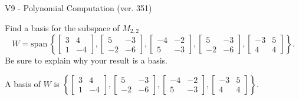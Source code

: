 \begin{exercise}
  \begin{exerciseTitle}V9 - Polynomial Computation (ver. 351)\end{exerciseTitle}
  \begin{exerciseStatement}
    Find a basis for the subspace of \(M_{2,2}\) 
\[W=\mathrm{span}\ \left\{\left[\begin{array}{cc}
3 & 4 \\
1 & -4
\end{array}\right] , \left[\begin{array}{cc}
5 & -3 \\
-2 & -6
\end{array}\right] , \left[\begin{array}{cc}
-4 & -2 \\
5 & -3
\end{array}\right] , \left[\begin{array}{cc}
5 & -3 \\
-2 & -6
\end{array}\right] , \left[\begin{array}{cc}
-3 & 5 \\
4 & 4
\end{array}\right]\right\}.\]
 Be sure to explain why your result is a basis.


  \end{exerciseStatement}
  \begin{exerciseAnswer}
   A basis of \(W\) is  \(\left\{\left[\begin{array}{cc}
3 & 4 \\
1 & -4
\end{array}\right] , \left[\begin{array}{cc}
5 & -3 \\
-2 & -6
\end{array}\right] , \left[\begin{array}{cc}
-4 & -2 \\
5 & -3
\end{array}\right] , \left[\begin{array}{cc}
-3 & 5 \\
4 & 4
\end{array}\right]\right\}\).
  


  \end{exerciseAnswer}
\end{exercise}